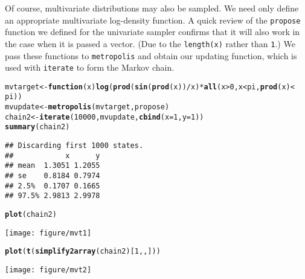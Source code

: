 \documentclass{article}\usepackage[]{graphicx}\usepackage[]{color}
\makeatletter
\def\maxwidth{ %
  \ifdim\Gin@nat@width>\linewidth
    \linewidth
  \else
    \Gin@nat@width
  \fi
}
\newcommand{\hlnum}[1]{\textcolor[rgb]{0.686,0.059,0.569}{#1}}%
\newcommand{\hlopt}[1]{\textcolor[rgb]{0,0,0}{#1}}%
\newcommand{\hlstd}[1]{\textcolor[rgb]{0.345,0.345,0.345}{#1}}%
\newcommand{\hlkwa}[1]{\textcolor[rgb]{0.161,0.373,0.58}{\textbf{#1}}}%
\newcommand{\hlkwb}[1]{\textcolor[rgb]{0.69,0.353,0.396}{#1}}%
\newcommand{\hlkwc}[1]{\textcolor[rgb]{0.333,0.667,0.333}{#1}}%
\newcommand{\hlkwd}[1]{\textcolor[rgb]{0.737,0.353,0.396}{\textbf{#1}}}%
\newenvironment{kframe}{%
 \def\at@end@of@kframe{}%
 \ifinner\ifhmode%
  \def\at@end@of@kframe{\end{minipage}}%
  \begin{minipage}{\columnwidth}%
 \fi\fi%
 \def\FrameCommand##1{\hskip\@totalleftmargin \hskip-\fboxsep
 \colorbox{shadecolor}{##1}\hskip-\fboxsep
     \hskip-\linewidth \hskip-\@totalleftmargin \hskip\columnwidth}%
 \MakeFramed {\advance\hsize-\width
   \@totalleftmargin\z@ \linewidth\hsize
   \@setminipage}}%
 {\par\unskip\endMakeFramed%
 \at@end@of@kframe}
\newenvironment{knitrout}{}{} %
\makeatother
\begin{document}
Of course, multivariate distributions may also be sampled. We need
only define an appropriate multivariate log-density function. A quick
review of the {\tt propose} function we defined for the univariate
sampler confirms that it will also work in the case when it is passed
a vector. (Due to the {\tt length(x)} rather than {\tt 1}.) We pass these functions to
{\tt metropolis} and obtain our updating function, which is used with
{\tt iterate} to form the Markov chain.
\begin{knitrout}
\color{fgcolor}\begin{kframe}
\begin{alltt}
\hlstd{mvtarget} \hlkwb{<-} \hlkwa{function}\hlstd{(}\hlkwc{x}\hlstd{)} \hlkwd{log}\hlstd{(}\hlkwd{prod}\hlstd{(}\hlkwd{sin}\hlstd{(}\hlkwd{prod}\hlstd{(x))}\hlopt{/}\hlstd{x)} \hlopt{*} \hlkwd{all}\hlstd{(x} \hlopt{>} \hlnum{0}\hlstd{, x} \hlopt{<} \hlstd{pi,} \hlkwd{prod}\hlstd{(x)} \hlopt{<}
    \hlstd{pi))}
\hlstd{mvupdate} \hlkwb{<-} \hlkwd{metropolis}\hlstd{(mvtarget, propose)}
\hlstd{chain2} \hlkwb{<-} \hlkwd{iterate}\hlstd{(}\hlnum{10000}\hlstd{, mvupdate,} \hlkwd{cbind}\hlstd{(}\hlkwc{x} \hlstd{=} \hlnum{1}\hlstd{,} \hlkwc{y} \hlstd{=} \hlnum{1}\hlstd{))}
\hlkwd{summary}\hlstd{(chain2)}
\end{alltt}
\begin{verbatim}
## Discarding first 1000 states.
##            x      y
## mean  1.3051 1.2055
## se    0.8184 0.7974
## 2.5%  0.1707 0.1665
## 97.5% 2.9813 2.9978
\end{verbatim}
\begin{alltt}
\hlkwd{plot}\hlstd{(chain2)}
\end{alltt}
\end{kframe}

{\centering \texttt{[image: figure/mvt1]} 

}


\begin{kframe}\begin{alltt}
\hlkwd{plot}\hlstd{(}\hlkwd{t}\hlstd{(}\hlkwd{simplify2array}\hlstd{(chain2)[}\hlnum{1}\hlstd{, , ]))}
\end{alltt}
\end{kframe}

{\centering \texttt{[image: figure/mvt2]} 

}



\end{knitrout}
\end{document}
